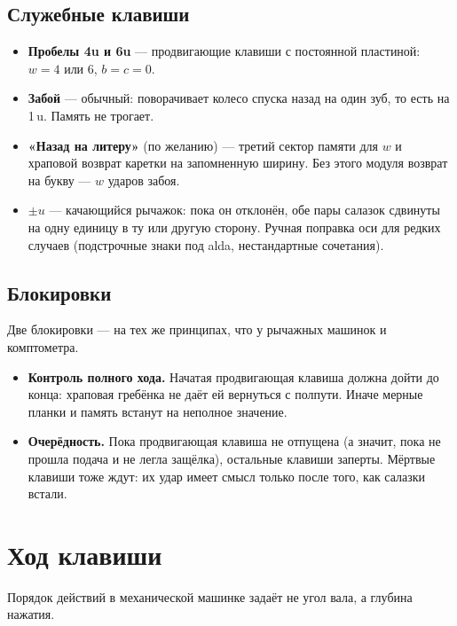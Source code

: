 \subsection{Служебные клавиши}

\begin{itemize}
  \item \textbf{Пробелы 4u и 6u} — продвигающие клавиши с постоянной пластиной: $w = 4$ или $6$, $b = c = 0$.
  \item \textbf{Забой} — обычный: поворачивает колесо спуска назад на один зуб, то есть на 1\,u. Память не трогает.
  \item \textbf{«Назад на литеру»} (по желанию) — третий сектор памяти для $w$ и храповой возврат каретки на запомненную ширину. Без этого модуля возврат на букву — $w$ ударов забоя.
  \item \textbf{$\pm u$} — качающийся рычажок: пока он отклонён, обе пары салазок сдвинуты на одну единицу в ту или другую сторону. Ручная поправка оси для редких случаев (подстрочные знаки под alda, нестандартные сочетания).
\end{itemize}

\subsection{Блокировки}

Две блокировки — на тех же принципах, что у рычажных машинок и комптометра.
\begin{itemize}
  \item \textbf{Контроль полного хода.} Начатая продвигающая клавиша должна дойти до конца: храповая гребёнка не даёт ей вернуться с полпути. Иначе мерные планки и память встанут на неполное значение.
  \item \textbf{Очерёдность.} Пока продвигающая клавиша не отпущена (а значит, пока не прошла подача и не легла защёлка), остальные клавиши заперты. Мёртвые клавиши тоже ждут: их удар имеет смысл только после того, как салазки встали.
\end{itemize}

\section{Ход клавиши}

Порядок действий в механической машинке задаёт не угол вала, а глубина нажатия.

